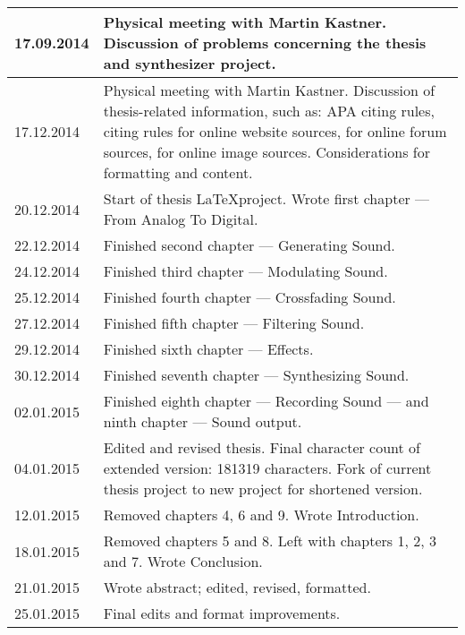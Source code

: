 {\begin{tabular}{| p{2cm} | p{13cm} |}
  \hline
  17.09.2014 & Physical meeting with Martin Kastner. Discussion of problems concerning the thesis and synthesizer project. \\
  \hline
  17.12.2014 & Physical meeting with Martin Kastner. Discussion of thesis-related information, such as: APA citing rules, citing rules for online website sources, for online forum sources, for online image sources. Considerations for formatting and content. \\
  \hline
  20.12.2014 & Start of thesis \LaTeX project. Wrote first chapter --- From Analog To Digital. \\
  \hline
  22.12.2014 & Finished second chapter --- Generating Sound. \\
  \hline
  24.12.2014 & Finished third chapter --- Modulating Sound. \\
  \hline
  25.12.2014 & Finished fourth chapter --- Crossfading Sound. \\
  \hline
  27.12.2014 & Finished fifth chapter --- Filtering Sound. \\
  \hline
  29.12.2014 & Finished sixth chapter --- Effects. \\
  \hline
  30.12.2014 & Finished seventh chapter --- Synthesizing Sound. \\
  \hline
  02.01.2015 & Finished eighth chapter --- Recording Sound --- and ninth chapter --- Sound output. \\
  \hline
  04.01.2015 & Edited and revised thesis. Final character count of extended version: 181319 characters. Fork of current thesis project to new project for shortened version. \\
  \hline
  12.01.2015 & Removed chapters 4, 6 and 9. Wrote Introduction. \\
  \hline
  18.01.2015 & Removed chapters 5 and 8. Left with chapters 1, 2, 3 and 7. Wrote Conclusion. \\
  \hline
  21.01.2015 & Wrote abstract; edited, revised, formatted. \\
  \hline
  25.01.2015 & Final edits and format improvements. \\
  \hline
\end{tabular}

}
